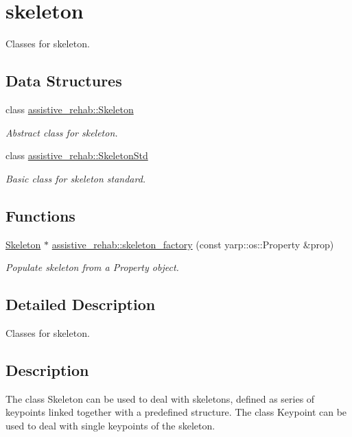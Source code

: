 \section{skeleton}
\label{group__skeleton}


Classes for skeleton.  


\subsection*{Data Structures}
\begin{DoxyCompactItemize}
\item 
class \mbox{\hyperlink{classassistive__rehab_1_1Skeleton}{assistive\+\_\+rehab\+::\+Skeleton}}
\begin{DoxyCompactList}\small\item\em Abstract class for skeleton. \end{DoxyCompactList}\item 
class \mbox{\hyperlink{classassistive__rehab_1_1SkeletonStd}{assistive\+\_\+rehab\+::\+Skeleton\+Std}}
\begin{DoxyCompactList}\small\item\em Basic class for skeleton standard. \end{DoxyCompactList}\end{DoxyCompactItemize}
\subsection*{Functions}
\begin{DoxyCompactItemize}
\item 
\mbox{\hyperlink{classassistive__rehab_1_1Skeleton}{Skeleton}} $\ast$ \mbox{\hyperlink{group__skeleton_gafe9fe27bb8b50a0843b93dfbb5c571b1}{assistive\+\_\+rehab\+::skeleton\+\_\+factory}} (const yarp\+::os\+::\+Property \&prop)
\begin{DoxyCompactList}\small\item\em Populate skeleton from a Property object. \end{DoxyCompactList}\end{DoxyCompactItemize}


\subsection{Detailed Description}
Classes for skeleton. 

\hypertarget{group__skeletonViewer_intro_sec}{}\subsection{Description}\label{group__skeletonViewer_intro_sec}
The class Skeleton can be used to deal with skeletons, defined as series of keypoints linked together with a predefined structure. The class Keypoint can be used to deal with single keypoints of the skeleton.

